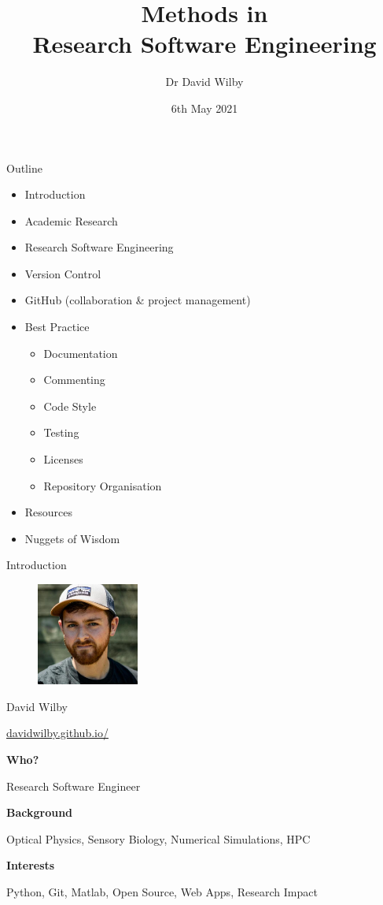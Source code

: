 \documentclass{beamer} %
\title{Methods in \\Research Software Engineering}
\date{6th May 2021}
\author{Dr David Wilby}
\institute{Research Software Engineering Team,\\ The University of Sheffield}
\begin{document}
  \begin{frame}
    \titlepage
  \end{frame}

  \begin{frame}{Outline}
    \begin{itemize}
      \item Introduction
      \item Academic Research
      \item Research Software Engineering
      \item Version Control
      \item GitHub (collaboration \& project management)
      \item Best Practice
      \begin{itemize}
        \item Documentation
        \item Commenting
        \item Code Style
        \item Testing
        \item Licenses
        \item Repository Organisation
      \end{itemize}
      \item Resources
      \item Nuggets of Wisdom
    \end{itemize}
  \end{frame}

  \begin{frame}{Introduction}

    \begin{figure}
        \includegraphics[width=0.3\textwidth]{wilby}
    \end{figure}

    David Wilby

    \href{https://davidwilby.github.io/}{davidwilby.github.io/}

    \textbf{Who?}
    
    Research Software Engineer

    \textbf{Background}

    Optical Physics, Sensory Biology, Numerical Simulations, HPC

    \textbf{Interests}

    Python, Git, Matlab, Open Source, Web Apps, Research Impact


  \end{frame}
\end{document}
